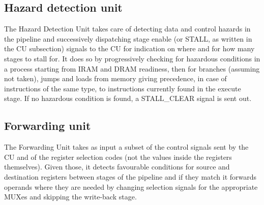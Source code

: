 \subsection{Hazard detection unit}
The Hazard Detection Unit takes care of detecting data and control hazards in the pipeline and successively dispatching stage enable (or STALL, as written in the CU subsection) signals to the CU for indication on where and for how many stages to stall for. It does so by progressively checking for hazardous conditions in a process starting from IRAM and DRAM readiness, then for branches (assuming not taken), jumps and loads from memory giving precedence, in case of instructions of the same type, to instructions currently found in the execute stage. If no hazardous condition is found, a STALL\_CLEAR signal is sent out.

\subsection{Forwarding unit}
The Forwarding Unit takes as input a subset of the control signals sent by the CU and of the register selection codes (not the values inside the registers themselves). Given those, it detects favourable conditions for source and destination registers between stages of the pipeline and if they match it forwards operands where they are needed by changing selection signals for the appropriate MUXes and skipping the write-back stage.